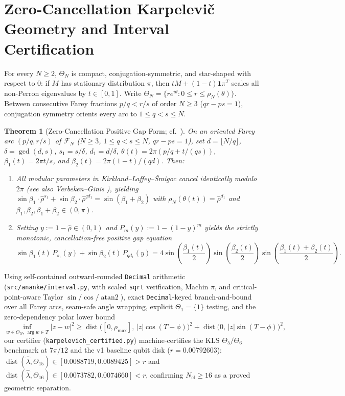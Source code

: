 \documentclass[11pt]{article}
\newtheorem{theorem}{Theorem}
\theoremstyle{definition}
\newcommand{\dist}{\operatorname{dist}}
\begin{document}
\section{Zero-Cancellation Karpelevi\v{c} Geometry and Interval Certification}

For every $N\ge 2$, $\Theta_N$ is compact, conjugation-symmetric, and star-shaped with respect to $0$: if $M$ has stationary distribution $\pi$, then $tM+(1-t)\mathbf{1}\pi^T$ scales all non-Perron eigenvalues by $t\in[0,1]$. Write $\Theta_N=\{re^{i\theta}:0\le r\le\rho_N(\theta)\}$. Between consecutive Farey fractions $p/q<r/s$ of order $N\ge 3$ ($qr-ps=1$), conjugation symmetry orients every arc to $1\le q<s\le N$.

\begin{theorem}[Zero-Cancellation Positive Gap Form; cf.\ \cite{KLS2020,VerbekenGinis2026}]\label{thm:gap}
On an oriented Farey arc $(p/q,r/s)$ of $\mathcal{F}_N$ ($N\ge 3$, $1\le q<s\le N$, $qr-ps=1$), set $d=\lfloor N/q\rfloor$, $\delta=\gcd(d,s)$, $s_1=s/\delta$, $d_1=d/\delta$, $\theta(t)=2\pi(p/q+t/(qs))$, $\beta_1(t)=2\pi t/s$, and $\beta_2(t)=2\pi(1-t)/(qd)$. Then:
\begin{enumerate}
\item All modular parameters in Kirkland--Laffey--\v{S}migoc \cite[Thm.~1.2]{KLS2020} cancel identically modulo $2\pi$ (see also Verbeken--Ginis \cite[Thm.~1.1]{VerbekenGinis2026}), yielding $\sin\beta_1\cdot\hat{\rho}^{s_1}+\sin\beta_2\cdot\hat{\rho}^{qd_1}=\sin(\beta_1+\beta_2)$ with $\rho_N(\theta(t))=\hat{\rho}^{d_1}$ and $\beta_1,\beta_2,\beta_1+\beta_2\in(0,\pi)$.
\item Setting $y:=1-\hat{\rho}\in(0,1)$ and $P_m(y):=1-(1-y)^m$ yields the strictly monotonic, cancellation-free positive gap equation
\[
 \sin\beta_1(t)\,P_{s_1}(y) + \sin\beta_2(t)\,P_{qd_1}(y)
 = 4\sin\!\left(\frac{\beta_1(t)}{2}\right)\sin\!\left(\frac{\beta_2(t)}{2}\right)\sin\!\left(\frac{\beta_1(t)+\beta_2(t)}{2}\right).
\]
\end{enumerate}
\end{theorem}

Using self-contained outward-rounded \texttt{Decimal} arithmetic (\texttt{src/ananke/interval.py}, with scaled \texttt{sqrt} verification, Machin $\pi$, and critical-point-aware Taylor $\sin/\cos/\operatorname{atan2}$), exact \texttt{Decimal}-keyed branch-and-bound over all Farey arcs, seam-safe angle wrapping, explicit $\Theta_1=\{1\}$ testing, and the zero-dependency polar lower bound
\[
 \inf_{w\in\Theta_N,\,\arg w\in T}|z-w|^2
 \ge \dist\!\bigl([0,\rho_{\max}],\,|z|\cos(T-\phi)\bigr)^2 + \dist\!\bigl(0,\,|z|\sin(T-\phi)\bigr)^2,
\]
our certifier (\texttt{karpelevich\_certified.py}) machine-certifies the KLS $\Theta_5/\Theta_6$ benchmark at $7\pi/12$ and the v1 baseline qubit disk ($r=0.00792603$): $\dist(\hat{\lambda},\Theta_{15})\in[0.0088719,0.0089425]>r$ and $\dist(\hat{\lambda},\Theta_{16})\in[0.0073782,0.0074660]<r$, confirming $N_{\mathrm{cl}}\ge 16$ as a proved geometric separation.
\end{document}
